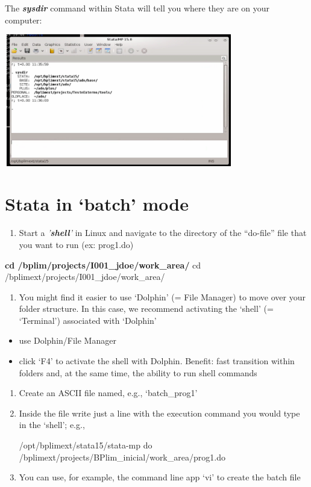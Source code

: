 \documentclass[]{book}
\providecommand{\tightlist}{%
  \setlength{\itemsep}{0pt}\setlength{\parskip}{0pt}}
\begin{document}
The \textbf{\emph{sysdir}} command within Stata will tell you where they are on
your computer:

\includegraphics[width=3.93681in,height=2.27514in]{./media/image13.png}

\hypertarget{stata-in-batch-mode}{%
\section{\texorpdfstring{{Stata in `batch' mode}}{Stata in `batch' mode}}\label{stata-in-batch-mode}}

\begin{enumerate}
\def\labelenumi{\arabic{enumi}.}
\tightlist
\item
  Start a \emph{'\textbf{shell}'} in Linux and navigate to the directory
  of the ``do-file'' file that you want to run (ex: prog1.do)
\end{enumerate}

\textbf{cd /bplim/projects/I001\_jdoe/work\_area/} cd
/bplimext/projects/I001\_jdoe/work\_area/

\begin{enumerate}
\def\labelenumi{\arabic{enumi}.}
\setcounter{enumi}{1}
\tightlist
\item
  You might find it easier to use `Dolphin' (= File Manager) to move
  over your folder structure. In this case, we recommend activating
  the `shell' (= `Terminal') associated with `Dolphin'
\end{enumerate}

\begin{itemize}
\item
  use Dolphin/File Manager
\item
  click `F4' to activate the shell with Dolphin. Benefit: fast
  transition within folders and, at the same time, the ability
  to run shell commands
\end{itemize}

\begin{enumerate}
\def\labelenumi{\arabic{enumi}.}
\setcounter{enumi}{2}
\item
  Create an ASCII file named, e.g., `batch\_prog1'
\item
  Inside the file write just a line with the execution command you
  would type in the `shell'; e.g.,

  /opt/bplimext/stata15/stata-mp do
  /bplimext/projects/BPlim\_inicial/work\_area/prog1.do
\item
  You can use, for example, the command line app `vi' to create the batch file
\end{enumerate}
\end{document}
